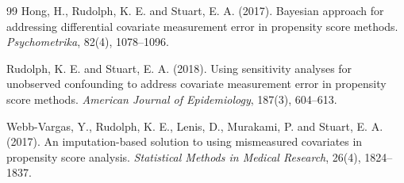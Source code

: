 \begin{thebibliography}{99}
 Hong, H., Rudolph, K. E. and Stuart, E. A. (2017). Bayesian approach for addressing differential covariate measurement error in propensity score methods. \emph{Psychometrika}, 82(4), 1078--1096.

 Rudolph, K. E. and Stuart, E. A. (2018). Using sensitivity analyses for unobserved confounding to address covariate measurement error in propensity score methods. \emph{American Journal of Epidemiology}, 187(3), 604--613.

 Webb-Vargas, Y., Rudolph, K. E., Lenis, D., Murakami, P. and Stuart, E. A. (2017). An imputation-based solution to using mismeasured covariates in propensity score analysis. \emph{Statistical Methods in Medical Research}, 26(4), 1824--1837.

\end{thebibliography}

